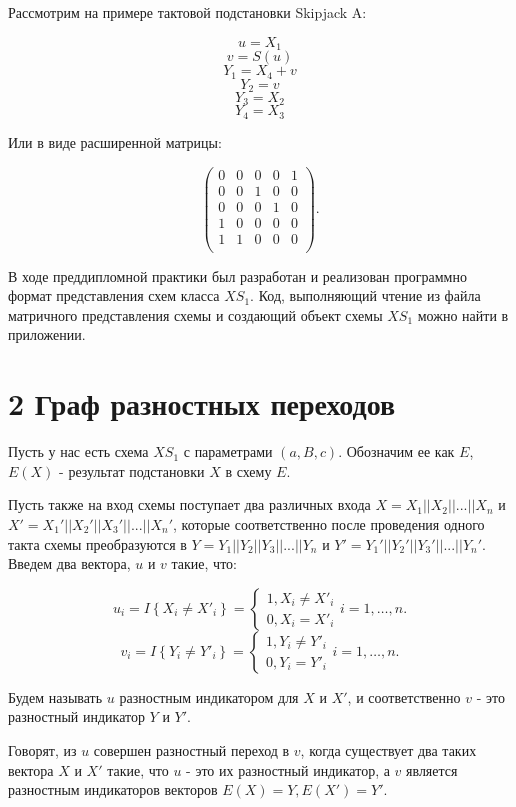 \documentclass[a4paper,12pt]{extarticle}
\begin{document}
\begin{large}
Рассмотрим на примере тактовой подстановки Skipjack A:

$$u = X_1$$
$$v = S(u)$$
$$Y_1 = X_4 + v$$
$$Y_2 = v$$
$$Y_3 = X_2$$
$$Y_4 = X_3$$

Или в виде расширенной матрицы:

$$
\begin{pmatrix}
0 & 0 & 0 & 0 & 1\\
0 & 0 & 1 & 0 & 0\\
0 & 0 & 0 & 1 & 0\\
1 & 0 & 0 & 0 & 0\\
1    & 1    & 0 & 0    & 0\\
\end{pmatrix}.
$$

В ходе преддипломной практики был разработан и реализован программно формат представления схем класса $XS_1$. Код, выполняющий чтение из файла матричного представления схемы и создающий объект схемы $XS_1$ можно найти в приложении. 

\newpage
\section*{2 Граф разностных переходов}
\vspace*{1cm}

Пусть у нас есть схема $XS_1$ с параметрами $(a, B, c)$. Обозначим ее как $E$,  $E(X)$ - результат подстановки $X$ в схему $E$. 

Пусть также на вход схемы поступает два различных входа $X=X_1||X_2||...||X_n$ и $X'=X_1'||X_2'||X_3'||...||X_n'$, которые соответственно после проведения одного такта схемы преобразуются в $Y=Y_1||Y_2||Y_3||...||Y_n$ и $Y'=Y_1'||Y_2'||Y_3'||...||Y_n'$. Введем два вектора, $u$ и $v$ такие, что:

$$
u_i=I\left\{X_i\ne X'_i\right\}=\left\{ \begin{array}{c}
1,X_i\ne X'_i \\
0,X_i=X'_i \end{array}
\right.i=1,\dots , n.
$$
$$
v_i=I\left\{Y_i\ne Y'_i\right\}=\left\{ \begin{array}{c}
1,Y_i\ne Y'_i \\
0,Y_i=Y'_i \end{array}
\right.i=1,\dots , n.
$$

Будем называть $u$ разностным индикатором для $X$ и $X'$, и соответственно $v$ - это разностный индикатор $Y$ и $Y'$.

Говорят, из $u$ совершен разностный переход в $v$, когда существует два таких вектора $X$ и $X'$ такие, что $u$ - это их разностный индикатор, а $v$ является разностным индикаторов векторов $E(X) = Y, E(X') = Y'$.


\end{large}
\end{document}
